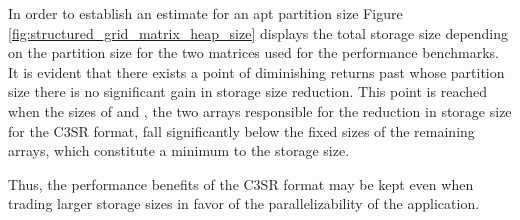     In order to establish an estimate for an apt partition size Figure \ref{fig:structured_grid_matrix_heap_size} displays the total storage size depending on the partition size for the two matrices used for the performance benchmarks. It is evident that there exists a point of diminishing returns past whose partition size there is no significant gain in storage size reduction. This point is reached when the sizes of \V and \J, the two arrays responsible for the reduction in storage size for the C3SR format, fall significantly below the fixed sizes of the remaining arrays, which constitute a minimum to the storage size.

    Thus, the performance benefits of the C3SR format may be kept even when trading larger storage sizes in favor of the parallelizability of the application.

